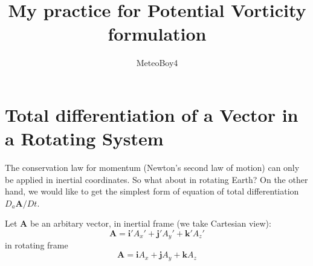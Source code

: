\documentclass[12pt]{article}
\begin{document}
\title{My practice for Potential Vorticity formulation}
\author{MeteoBoy4}
\maketitle

\section{Total differentiation of a Vector in a Rotating System}

The conservation law for momentum (Newton's second law of motion) can only be applied in inertial coordinates.
So what about in rotating Earth?
On the other hand, we would like to get the simplest form of equation of total differentiation $D_{a}\bm{A}/Dt$.

Let $\bm{A}$ be an arbitary vector, in inertial frame (we take Cartesian view):
\begin{equation}
    \bm{A} = \bm{i}'A_{x}'+\bm{j}'A_{y}'+\bm{k}'A_{z}'
\end{equation}
in rotating frame
\begin{equation}
    \bm{A} = \bm{i}A_x+\bm{j}A_y+\bm{k}A_z
\end{equation}
\end{document}
